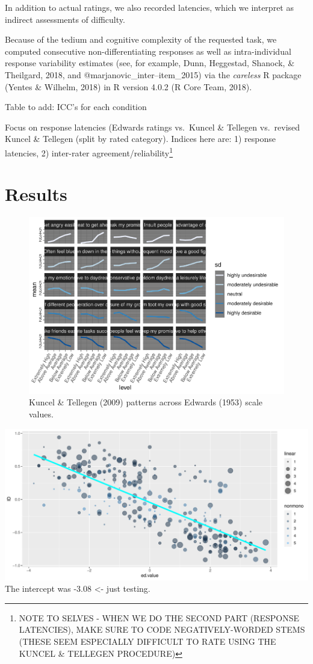 \documentclass[
  english,
  ,jou]{apa6}
\begin{document}
In addition to actual ratings, we also recorded latencies, which we interpret as indirect assessments of difficulty.

Because of the tedium and cognitive complexity of the requested task, we computed consecutive non-differentiating responses as well as intra-individual response variability estimates (see, for example, Dunn, Heggestad, Shanock, \& Theilgard, 2018, and @marjanovic\_inter--item\_2015) via the \emph{careless} R package (Yentes \& Wilhelm, 2018) in R version 4.0.2 (R Core Team, 2018).

Table to add: ICC's for each condition

Focus on response latencies (Edwards ratings vs.~Kuncel \& Tellegen vs.~revised Kuncel \& Tellegen (split by rated category). Indices here are: 1) response latencies, 2) inter-rater agreement/reliability\footnote{NOTE TO SELVES - WHEN WE DO THE SECOND PART (RESPONSE LATENCIES), MAKE SURE TO CODE NEGATIVELY-WORDED STEMS (THESE SEEM ESPECIALLY DIFFICULT TO RATE USING THE KUNCEL \& TELLEGEN PROCEDURE)}

\hypertarget{results}{%
\section{Results}\label{results}}

\begin{figure}
\centering
\includegraphics{KuncelTellegen_files/figure-latex/Figure2-1.pdf}
\caption{\label{fig:Figure2}Kuncel \& Tellegen (2009) patterns across Edwards (1953) scale values.}
\end{figure}

\includegraphics{KuncelTellegen_files/figure-latex/Figure3-1.pdf}
The intercept was -3.08 \textless- just testing.
\end{document}
